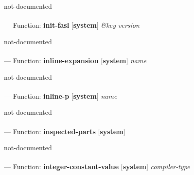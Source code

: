 \begin{adjustwidth}{5em}{5em}
not-documented
\end{adjustwidth}

\paragraph{}
\label{SYSTEM:INIT-FASL}
--- Function: \textbf{init-fasl} [\textbf{system}] \textit{\&key version}

\begin{adjustwidth}{5em}{5em}
not-documented
\end{adjustwidth}

\paragraph{}
\label{SYSTEM:INLINE-EXPANSION}
--- Function: \textbf{inline-expansion} [\textbf{system}] \textit{name}

\begin{adjustwidth}{5em}{5em}
not-documented
\end{adjustwidth}

\paragraph{}
\label{SYSTEM:INLINE-P}
--- Function: \textbf{inline-p} [\textbf{system}] \textit{name}

\begin{adjustwidth}{5em}{5em}
not-documented
\end{adjustwidth}

\paragraph{}
\label{SYSTEM:INSPECTED-PARTS}
--- Function: \textbf{inspected-parts} [\textbf{system}] \textit{}

\begin{adjustwidth}{5em}{5em}
not-documented
\end{adjustwidth}

\paragraph{}
\label{SYSTEM:INTEGER-CONSTANT-VALUE}
--- Function: \textbf{integer-constant-value} [\textbf{system}] \textit{compiler-type}

